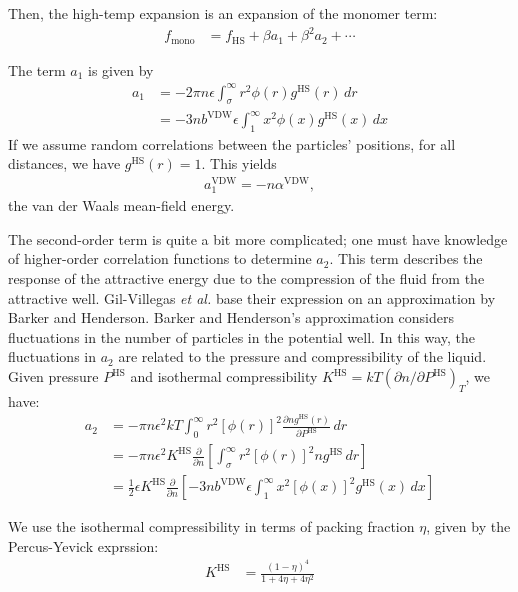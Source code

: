 \documentclass[letterpaper,twocolumn,amsmath,amssymb,prb]{revtex4-1}
\newcommand{\1}{\ensuremath{\textbf{r}_1}}
\newcommand{\2}{\ensuremath{\textbf{r}_2}}
\begin{document}
Then, the high-temp expansion is an expansion of the monomer term:
\begin{align}
  f_\text{mono} &= f_\text{HS} + \beta a_1 + \beta^2 a_2 + \cdots
\end{align}

The term $a_1$ is given by
\begin{align}
  a_1 &= -2\pi n \epsilon\int_\sigma^\infty r^2\phi(r)g^\text{HS}(r)\,dr \\
  &= -3 n  b^\text{VDW}\epsilon\int_1^\infty x^2\phi(x)g^\text{HS}(x)\,dx
\end{align}
If we assume random correlations between the particles' positions, for all distances, we have $g^\text{HS}(r) = 1$. This yields
\begin{align}
  a_1^\text{VDW} = - n \alpha^\text{VDW},
\end{align}
the van der Waals mean-field energy.

The second-order term is quite a bit more complicated; one must have knowledge of higher-order correlation functions to determine $a_2$. This term describes the response of the attractive energy due to the compression of the fluid from the attractive well. Gil-Villegas \emph{et al.} base their expression on an approximation by Barker and Henderson\cite{Barker67}. Barker and Henderson's approximation considers fluctuations in the number of particles in the potential well. In this way, the fluctuations in $a_2$ are related to the pressure and compressibility of the liquid. Given pressure $P^\text{HS}$ and isothermal compressibility $K^\text{HS} = kT\left(\partial n  /\partial P^\text{HS}\right)_T$, we have:
\begin{align}
  a_2 &= -\pi n \epsilon^2kT\int_0^\infty r^2\left[\phi(r)\right]^2\frac{\partial n  g^\text{HS}(r)}{\partial P^\text{HS}}\,dr \\
  &= -\pi n \epsilon^2K^\text{HS}\frac{\partial}{\partial n }\left[\int_\sigma^\infty r^2\left[\phi(r)\right]^2 n  g^\text{HS}\,dr\right] \\
  &= \frac{1}{2}\epsilon K^\text{HS}\frac{\partial}{\partial n }\left[-3 n  b^\text{VDW}\epsilon\int_1^\infty x^2\left[\phi(x)\right]^2 g^\text{HS}(x)\,dx \right]
\end{align}

We use the isothermal compressibility in terms of packing fraction $\eta$, given by the Percus-Yevick exprssion\cite{Barker76}:
\begin{align}
  K^\text{HS} &= \frac{\left(1 - \eta\right)^4}{1 + 4\eta + 4\eta^2}
\end{align}
\end{document}
